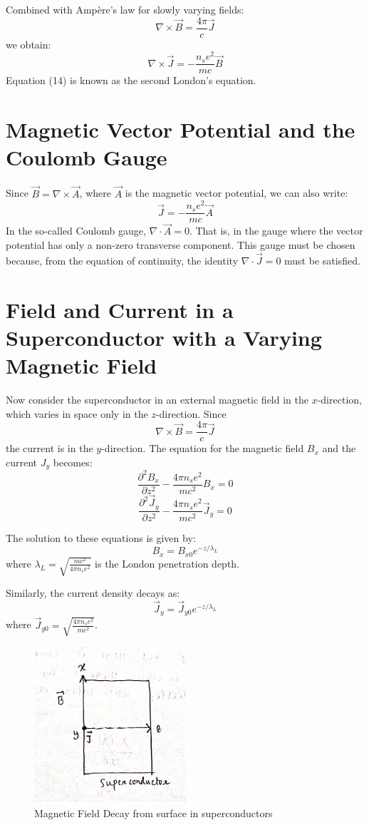 \documentclass{article}
\begin{document}
Combined with Ampère's law for slowly varying fields:
\[
\nabla \times \vec{B} = \frac{4\pi}{c} \vec{J}
\]
we obtain:
\[
\nabla \times \vec{J} = -\frac{n_s e^2}{mc} \vec{B} \tag{14}
\]
Equation (14) is known as the second London's equation.

\section{Magnetic Vector Potential and the Coulomb Gauge}

Since \(\vec{B} = \nabla \times \vec{A}\), where \(\vec{A}\) is the magnetic vector potential, we can also write:
\[
\vec{J} = - \frac{n_s e^2}{mc} \vec{A} \tag{15}
\]
In the so-called Coulomb gauge, \(\nabla \cdot \vec{A} = 0\). That is, in the gauge where the vector potential has only a non-zero transverse component. This gauge must be chosen because, from the equation of continuity, the identity \(\nabla \cdot \vec{J} = 0\) must be satisfied.

\section{Field and Current in a Superconductor with a Varying Magnetic Field}

Now consider the superconductor in an external magnetic field in the \(x\)-direction, which varies in space only in the \(z\)-direction. Since
\[
\nabla \times \vec{B} = \frac{4\pi}{c} \vec{J}
\]
the current is in the \(y\)-direction. The equation for the magnetic field \(B_x\) and the current \(J_y\) becomes:
\[
\frac{\partial^2 B_x}{\partial z^2} - \frac{4\pi n_s e^2}{mc^2} B_x = 0
\]
\[
\frac{\partial^2 \vec{J}_y}{\partial z^2} - \frac{4\pi n_s e^2}{mc^2} \vec{J}_y = 0
\]

The solution to these equations is given by:
\[
B_x = B_{x0} e^{-z/\lambda_L} \tag{14}
\]
where \(\lambda_L = \sqrt{\frac{mc^2}{4\pi n_s e^2}}\) is the London penetration depth.

Similarly, the current density decays as:
\[
\vec{J}_y = \vec{J}_{y0} e^{-z/\lambda_L}
\]
where \(\vec{J}_{y0} = \sqrt{\frac{4\pi n_s e^2}{mc^2}} \).

\begin{figure}
    \begin{center}
        \includegraphics[width=0.5\textwidth]{figures/5.png}
    \end{center}
    \caption{Magnetic Field Decay from surface in superconductors}\label{fig:}
\end{figure}
\end{document}
